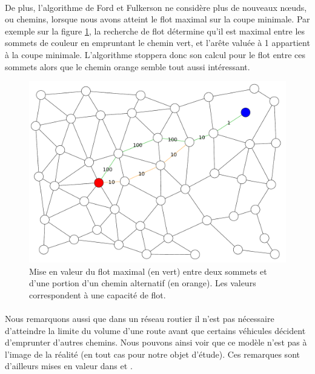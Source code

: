 \documentclass[a4paper, 10pt]{report}
\begin{document}
\paragraph{}De plus, l'algorithme de Ford et Fulkerson ne considère plus de nouveaux n\oe uds, ou chemins, lorsque nous avons atteint le flot maximal sur la coupe minimale. Par exemple sur la figure \ref{fig:flot_max}, la recherche de flot détermine qu'il est maximal entre les sommets de couleur en empruntant le chemin vert, et l'arête valuée à 1 appartient à la coupe minimale. L'algorithme stoppera donc son calcul pour le flot entre ces sommets alors que le chemin orange semble tout aussi intéressant. 

\begin{figure}[h!]
	\centering
	\includegraphics[width=1.\textwidth]{./img/probleme_centrality_flow.pdf}
	\caption{Mise en valeur du flot maximal (en vert) entre deux sommets et d'une portion d'un chemin alternatif (en orange). Les valeurs correspondent à une capacité de flot.}
	\label{fig:flot_max}
\end{figure}

\paragraph{}Nous remarquons aussi que dans un réseau routier il n'est pas nécessaire d'atteindre la limite du volume d'une route avant que certains véhicules décident d'emprunter d'autres chemins. Nous pouvons ainsi voir que ce modèle n'est pas à l'image de la réalité (en tout cas pour notre objet d'étude). Ces remarques sont d'ailleurs mises en valeur dans \cite{Newman2005MeasureBetweenness} et \cite{Gleyze2005Vulneraibilite}.
\end{document}
